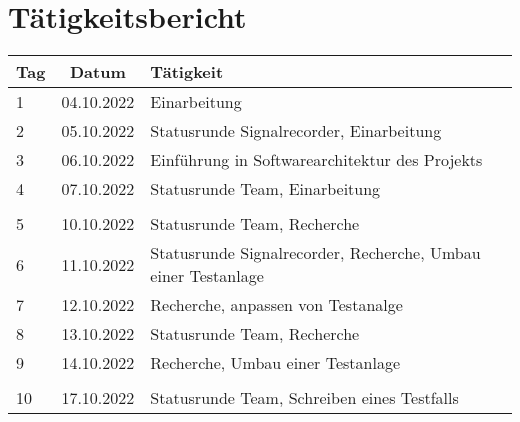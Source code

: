 \newpage
\section{Tätigkeitsbericht}
\begin{longtable}{|l|c|l|}
        \hline
    Tag &    Datum & Tätigkeit \\ \hline
        \endfirsthead
        \endhead








                                                   
1   & 04.10.2022    & Einarbeitung                                                      \\ \hline
2   & 05.10.2022    & Statusrunde Signalrecorder, Einarbeitung                            \\ \hline
3   & 06.10.2022    & Einführung in Softwarearchitektur des Projekts         \\ \hline
4   & 07.10.2022    & Statusrunde Team, Einarbeitung                                      \\ \hline
    &               &                                                       \\ \hline
5   & 10.10.2022    & Statusrunde Team, Recherche                                      \\ \hline        
6   & 11.10.2022    & Statusrunde Signalrecorder, Recherche, Umbau einer Testanlage                          \\ \hline   
7   & 12.10.2022    & Recherche, anpassen von Testanalge                                                   \\ \hline   
8   & 13.10.2022    & Statusrunde Team, Recherche                                                      \\ \hline   
9   & 14.10.2022    & Recherche, Umbau einer Testanlage                                                      \\ \hline
    &               &                                                       \\ \hline
10  & 17.10.2022    & Statusrunde Team, Schreiben eines Testfalls                                                      \\ \hline   

\end{longtable}
